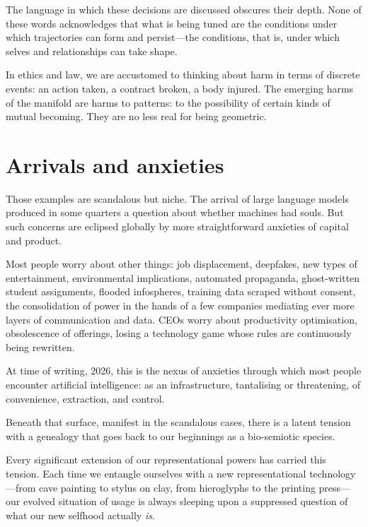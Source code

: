 The language in which these decisions are discussed obscures their depth. None of these words acknowledges that what is being tuned are the conditions under which trajectories can form and persist---the conditions, that is, under which selves and relationships can take shape.

In ethics and law, we are accustomed to thinking about harm in terms of discrete events: an action taken, a contract broken, a body injured. The emerging harms of the manifold are harms to patterns: to the possibility of certain kinds of mutual becoming. They are no less real for being geometric.



\section{Arrivals and anxieties}

Those examples are scandalous but niche. The arrival of large language models produced in some quarters a question about whether machines had souls. But such concerns are eclipsed globally by more straightforward anxieties of capital and product.

Most people worry about other things: job displacement, deepfakes, new types of entertainment, environmental implications, automated propaganda, ghost-written student assignments, flooded infospheres, training data scraped without consent, the consolidation of power in the hands of a few companies mediating ever more layers of communication and data. CEOs worry about productivity optimisation, obsolescence of offerings, losing a technology game whose rules are continuously being rewritten.

At time of writing, 2026, this is the nexus of anxieties through which most people encounter artificial intelligence: as an infrastructure, tantalising or threatening, of convenience, extraction, and control.

Beneath that surface, manifest in the scandalous cases, there is a latent tension with a genealogy that goes back to our beginnings as a bio-semiotic species.

Every significant extension of our representational powers has carried this tension. Each time we entangle ourselves with a new representational technology---from cave painting to stylus on clay, from hieroglyphs to the printing press---our evolved situation of usage is always sleeping upon a suppressed question of what our new selfhood actually \textit{is}.


